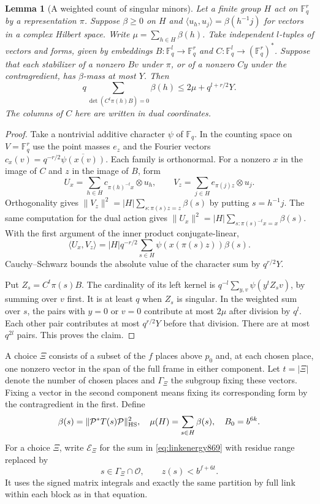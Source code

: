 \documentclass[a4paper,11pt]{article}
\newtheorem{lemma}[proposition]{Lemma}
\theoremstyle{definition}
\theoremstyle{remark}
\numberwithin{equation}{section}
\begin{document}
\begin{lemma}[A weighted count of singular minors]\leavevmode
\label{lem:singularminor870}
Let a finite group \(H\) act on \(\mathbb F_q^r\) by a
representation \(\pi\). Suppose \(\beta\ge0\) on \(H\) and
\(\langle u_h,u_j\rangle=\beta(h^{-1}j)\) for vectors in a
complex Hilbert space. Write \(\mu=\sum_{h\in H}\beta(h)\).
Take independent \(l\)-tuples of vectors and forms, given by
embeddings \(B:\mathbb F_q^l\longrightarrow\mathbb F_q^r\)
and \(C:\mathbb F_q^l\longrightarrow(\mathbb F_q^r)^*\).
Suppose that each stabilizer of a nonzero \(Bv\) under \(\pi\),
or of a nonzero \(Cy\) under the contragredient, has
\(\beta\)-mass at most \(Y\). Then
\[
  q\sum_{\det(C^t\pi(h)B)=0}\beta(h)
       \le 2\mu+q^{l+r/2}Y .
\]
The columns of \(C\) here are written in dual coordinates.
\end{lemma}
\begin{proof}
Take a nontrivial additive character \(\psi\) of \(\mathbb F_q\).
In the counting space on \(V=\mathbb F_q^r\) use the point
masses \(e_z\) and the Fourier vectors
\(c_x(v)=q^{-r/2}\overline{\psi(x(v))}\).
Each family is orthonormal. For a nonzero \(x\) in the image of
\(C\) and \(z\) in the image of \(B\), form
\[
   U_x=\sum_{h\in H}c_{\pi(h)^{-t}x}\otimes u_h,\qquad
   V_z=\sum_{j\in H}e_{\pi(j)z}\otimes u_j.
\]
Orthogonality gives \(\|V_z\|^2=|H|\sum_{s:\pi(s)z=z}\beta(s)\)
by putting \(s=h^{-1}j\). The same computation for the dual
action gives \(\|U_x\|^2=|H|\sum_{s:\pi(s)^{-t}x=x}\beta(s)\).
With the first argument of the inner product conjugate-linear,
\[
 \langle U_x,V_z\rangle
   =|H|q^{-r/2}\sum_{s\in H}\psi(x(\pi(s)z))\beta(s).
\]
Cauchy--Schwarz bounds the absolute value of the character
sum by \(q^{r/2}Y\).

Put \(Z_s=C^t\pi(s)B\). The cardinality of its left kernel is
\(q^{-l}\sum_{y,v}\psi(y^t Z_s v)\), by summing over \(v\)
first. It is at least \(q\) when \(Z_s\) is singular.
In the weighted sum over \(s\), the pairs with \(y=0\) or
\(v=0\) contribute at most \(2\mu\) after division by \(q^l\).
Each other pair contributes at most \(q^{r/2}Y\) before that
division. There are at most \(q^{2l}\) pairs. This proves the
claim.
\end{proof}

A choice \(\Xi\) consists of a subset of the \(f\) places above
\(p_0\) and, at each chosen place, one nonzero vector in the
span of the full frame in either component. Let \(t=|\Xi|\)
denote the number of chosen places and \(\Gamma_\Xi\) the
subgroup fixing these vectors. Fixing a vector in the second
component means fixing its corresponding form by the
contragredient in the first. Define
\[
 \beta(s)=\|\mathcal P^*T(s)\mathcal P\|_{\rm HS}^2,\quad
 \mu(H)=\sum_{s\in H}\beta(s),\quad B_0=b^{6k}.
\]
For a choice \(\Xi\), write \(\mathcal E_\Xi\) for the sum in
\eqref{eq:linkenergy869} with residue range replaced by
\[
    s\in\Gamma_\Xi\cap\mathcal O,\qquad z(s)< b^{f+6t}.
\]
It uses the signed matrix integrals and exactly the same
partition by full link within each block as in that equation.
\end{document}
